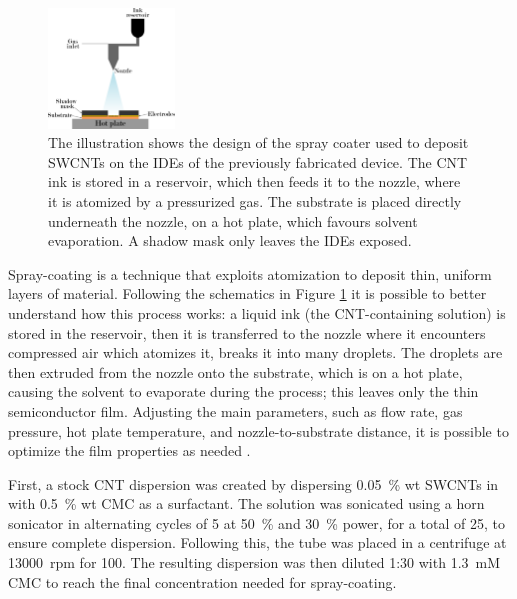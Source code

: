 \begin{figure}
    \centering
    \includegraphics[width = 0.3\textwidth]{figures/chapter2/cntDeposition/Fig10_cntSpray.pdf}
    \caption{The illustration shows the design of the spray coater used to deposit SWCNTs on the IDEs of the previously fabricated device. The CNT ink is stored in a reservoir, which then feeds it to the nozzle, where it is atomized by a pressurized gas. The substrate is placed directly underneath the nozzle, on a hot plate, which favours solvent evaporation. A shadow mask only leaves the IDEs exposed.}
    \label{fig:sprayCoater}
\end{figure}

Spray-coating is a technique that exploits atomization to deposit thin, uniform layers of material. Following the schematics in Figure \ref{fig:sprayCoater} it is possible to better understand how this process works: a liquid ink (the CNT-containing solution) is stored in the reservoir, then it is transferred to the nozzle where it encounters compressed air which atomizes it, \ie{} breaks it into many droplets. The droplets are then extruded from the nozzle onto the substrate, which is on a hot plate, causing the solvent to evaporate during the process; this leaves only the thin semiconductor film. Adjusting the main parameters, such as flow rate, gas pressure, hot plate temperature, and nozzle-to-substrate distance, it is possible to optimize the film properties as needed \citep{shkodraElectrolytegated2021,shkodraOptimization2023}.

First, a stock CNT dispersion was created by dispersing \SI{0.05}{\%} wt SWCNTs in  with \SI{0.5}{\%} wt CMC as a surfactant. The solution was sonicated using a horn sonicator in alternating cycles of \SI{5}{\min} at \SI{50}{\%} and \SI{30}{\%} power, for a total of \SI{25}{\min}, to ensure complete dispersion. Following this, the tube was placed in a centrifuge at \SI{13000}{rpm} for \SI{100}{\min}. The resulting dispersion was then diluted 1:30 with \SI{1.3}{mM} CMC to reach the final concentration needed for spray-coating.

